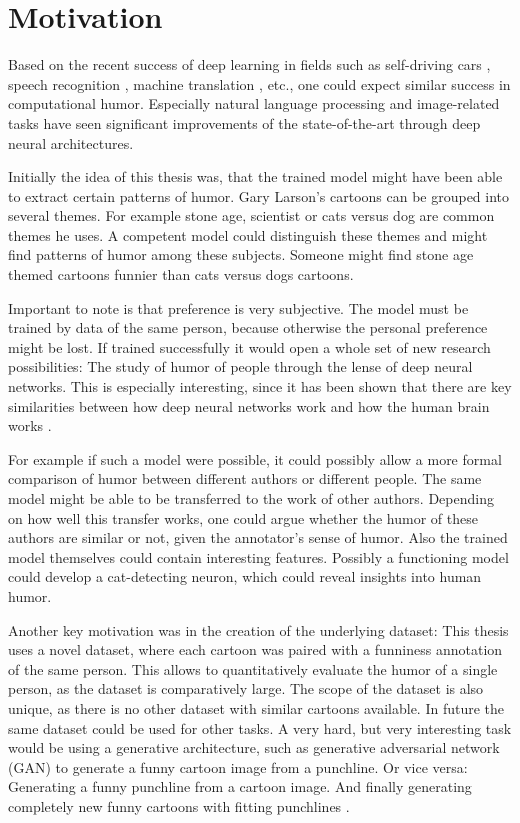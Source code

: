 \documentclass[draft,final,oneside]{vutinfth} %
\begin{document}
\section{Motivation}

Based on the recent success of deep learning in fields such as self-driving cars \cite{selfdriving}, speech recognition \cite{speech}, machine translation \cite{nmt}, etc., one could expect similar success in computational humor. Especially natural language processing and image-related tasks have seen significant improvements of the state-of-the-art through deep neural architectures.

Initially the idea of this thesis was, that the trained model might have been able to extract certain patterns of humor. Gary Larson's cartoons can be grouped into several themes. For example stone age, scientist or cats versus dog are common themes he uses. A competent model could distinguish these themes and might find patterns of humor among these subjects. Someone might find stone age themed cartoons funnier than cats versus dogs cartoons. 

Important to note is that preference is very subjective. The model must be trained by data of the same person, because otherwise the personal preference might be lost. If trained successfully it would open a whole set of new research possibilities: The study of humor of people through the lense of deep neural networks. This is especially interesting, since it has been shown that there are key similarities between how deep neural networks work and how the human brain works \cite{Cichy2016}.

For example if such a model were possible, it could possibly allow a more formal comparison of humor between different authors or different people.
The same model might be able to be transferred to the work of other authors. Depending on how well this transfer works, one could argue whether the humor of these authors are similar or not, given the annotator's sense of humor. Also the trained model themselves could contain interesting features. Possibly a functioning model could develop a cat-detecting neuron, which could reveal insights into human humor.

Another key motivation was in the creation of the underlying dataset: This thesis uses a novel dataset, where each cartoon was paired with a funniness annotation of the same person. This allows to quantitatively evaluate the humor of a single person, as the dataset is comparatively large. The scope of the dataset is also unique, as there is no other dataset with similar cartoons available. In future the same dataset could be used for other tasks. A very hard, but very interesting task would be using a generative architecture, such as generative adversarial network (GAN) to generate a funny cartoon image from a punchline. Or vice versa: Generating a funny punchline from a cartoon image. And finally generating completely new funny cartoons with fitting punchlines \cite{gan2}\cite{gan}.
\end{document}
